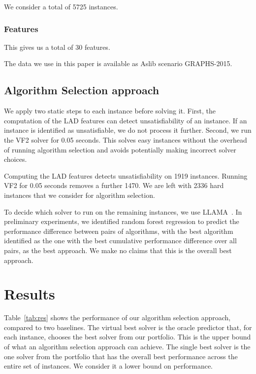 \documentclass{llncs}
\begin{document}
We consider a total of 5725 instances.

\subsubsection{Features}


This gives us a total of 30 features.

The data we use in this paper is available as Aslib scenario GRAPHS-2015.

\subsection{Algorithm Selection approach}

We apply two static steps to each instance before solving it. First, the
computation of the LAD features can detect unsatisfiability of an instance. If
an instance is identified as unsatisfiable, we do not process it further.
Second, we run the VF2 solver for 0.05 seconds. This solves easy instances
without the overhead of running algorithm selection and avoids potentially
making incorrect solver choices.

Computing the LAD features detects unsatisfiability on 1919 instances. Running
VF2 for 0.05 seconds removes a further 1470. We are left with 2336 hard
instances that we consider for algorithm selection.

To decide which solver to run on the remaining instances, we use
LLAMA~\cite{kotthoff_llama_2013}. In preliminary experiments, we identified
random forest regression to predict the performance difference between pairs of
algorithms, with the best algorithm identified as the one with the best
cumulative performance difference over all pairs, as the best approach. We make
no claims that this is the overall best approach.

\section{Results}

Table~\ref{tab:res} shows the performance of our algorithm selection approach,
compared to two baselines. The virtual best solver is the oracle predictor that,
for each instance, chooses the best solver from our portfolio. This is the upper
bound of what an algorithm selection approach can achieve. The single best
solver is the one solver from the portfolio that has the overall best
performance across the entire set of instances. We consider it a lower bound on
performance.
\end{document}
